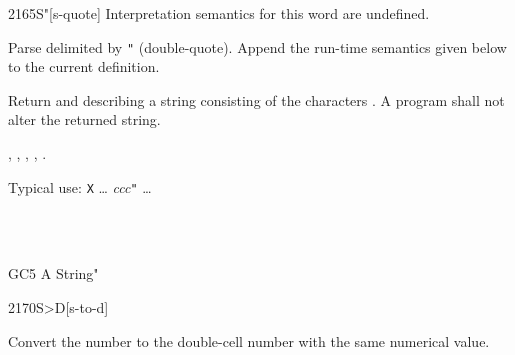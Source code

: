 \begin{worddef}[Sq]{2165}{S"}[s-quote]
\interpret
	Interpretation semantics for this word are undefined.

\compile

	Parse  delimited by \texttt{"} (double-quote).
	Append the run-time semantics given below to the current
	definition.

\runtime

	Return  and  describing a string
	consisting of the characters . A program shall
	not alter the returned string.

\see {},
	,
	,
	,
	.

	\begin{rationale} %
		Typical use:
			\word{:} \texttt{X} {\ldots}
				 \emph{ccc}\texttt{"}
			{\ldots} \word{;}
	\end{rationale}

	\begin{testing} %
		 \\
		 \\

		\word{:} GC5  A String" \word{;}   \\
	\end{testing}
\end{worddef}


\begin{worddef}[StoD]{2170}{S>D}[s-to-d]
\item {}

	Convert the number  to the double-cell number 
	with the same numerical value.

	\begin{testing} %
		 \\
		 \\
		 \\
		 \\
		 \\
		 \\
	\end{testing}
\end{worddef}


